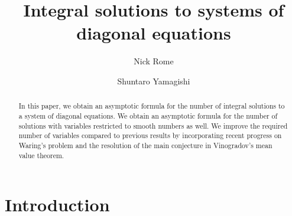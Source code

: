 \documentclass[reqno, 12pt, reqno]{amsart}
\title{Integral solutions to systems of diagonal equations}
\author{Nick Rome}
\author{Shuntaro Yamagishi}
\numberwithin{equation}{section}
\renewcommand{\=}{\equiv}
\begin{document}
\maketitle

\begin{abstract}
In this paper, we obtain an asymptotic formula for the number of integral solutions to a system of diagonal equations.
We obtain an asymptotic formula for the number of solutions with variables restricted to smooth numbers as well.
We improve the required number of variables compared to previous results by
incorporating recent progress on Waring's problem and the resolution of the main conjecture in Vinogradov's mean value theorem.
\end{abstract}





\section{Introduction}\label{sec:}
\end{document}
